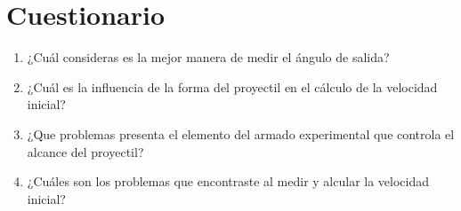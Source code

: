 \documentclass[journal]{IEEEtran}
\begin{document}
\section{Cuestionario}

\begin{enumerate}
    \item ¿Cuál consideras es la mejor manera de medir el ángulo de salida?
    
    \item ¿Cuál es la influencia de la forma del proyectil en el cálculo de la velocidad inicial?
    
    \item ¿Que problemas presenta el elemento del armado experimental que controla el alcance del proyectil?
    
    \item ¿Cuáles son los problemas que encontraste al medir y alcular la velocidad inicial?
    
   
    
\end{enumerate}




  
 
\end{document}
